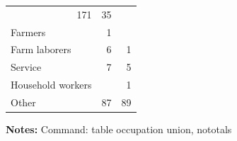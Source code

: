 \documentclass{article}
\begin{document}
\begin{table}[htbp]
\begin{threeparttable}
\begin{tabular}{lll}
  \multicolumn{1}{r}{171} &
  \multicolumn{1}{r}{35} \\
\multicolumn{1}{l}{\hspace{1em}Farmers} &
  \multicolumn{1}{r}{1} &
  \multicolumn{1}{r}{} \\
\multicolumn{1}{l}{\hspace{1em}Farm laborers} &
  \multicolumn{1}{r}{6} &
  \multicolumn{1}{r}{1} \\
\multicolumn{1}{l}{\hspace{1em}Service} &
  \multicolumn{1}{r}{7} &
  \multicolumn{1}{r}{5} \\
\multicolumn{1}{l}{\hspace{1em}Household workers} &
  \multicolumn{1}{r}{} &
  \multicolumn{1}{r}{1} \\
\multicolumn{1}{l}{\hspace{1em}Other} &
  \multicolumn{1}{r}{87} &
  \multicolumn{1}{r}{89} \\
\bottomrule
\end{tabular}

 \footnotesize  
\textbf{Notes:} Command: table occupation union, nototals 
\end{threeparttable} 
\end{table}
\end{document}
